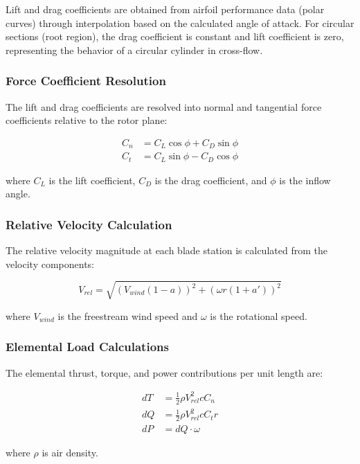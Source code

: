 \documentclass[11pt]{article}
\begin{document}
Lift and drag coefficients are obtained from airfoil performance data (polar curves) through interpolation based on the calculated angle of attack. For circular sections (root region), the drag coefficient is constant and lift coefficient is zero, representing the behavior of a circular cylinder in cross-flow.

\subsubsection{Force Coefficient Resolution}

The lift and drag coefficients are resolved into normal and tangential force coefficients relative to the rotor plane:

\begin{align}
C_n &= C_L \cos\phi + C_D \sin\phi \\
C_t &= C_L \sin\phi - C_D \cos\phi
\end{align}

where $C_L$ is the lift coefficient, $C_D$ is the drag coefficient, and $\phi$ is the inflow angle.

\subsubsection{Relative Velocity Calculation}

The relative velocity magnitude at each blade station is calculated from the velocity components:

\begin{equation}
V_{rel} = \sqrt{(V_{wind}(1-a))^2 + (\omega r(1+a'))^2}
\end{equation}

where $V_{wind}$ is the freestream wind speed and $\omega$ is the rotational speed.

\subsubsection{Elemental Load Calculations}

The elemental thrust, torque, and power contributions per unit length are:

\begin{align}
dT &= \frac{1}{2}\rho V_{rel}^2 c C_n \\
dQ &= \frac{1}{2}\rho V_{rel}^2 c C_t r \\
dP &= dQ \cdot \omega
\end{align}

where $\rho$ is air density.
\end{document}
